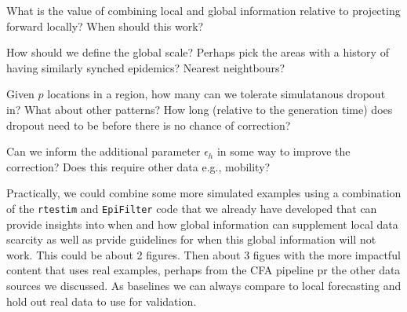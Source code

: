 \documentclass[12pt]{article}
\begin{document}
\bitem
\item What is the value of combining local and global information relative to
projecting forward locally? When should this work?
\item How should we define the global scale? Perhaps pick the areas with a
history of having similarly synched epidemics? Nearest neightbours?
\item Given $p$ locations in a region, how many can we tolerate simulatanous
dropout in? What about other patterns? How long (relative to the generation
time) does dropout need to be before there is no chance of correction?
\item Can we inform the additional parameter $\epsilon_h$ in some way to improve
the correction? Does this require other data e.g., mobility?
\eitem

Practically, we could combine some more simulated examples using a combination
of the \texttt{rtestim} and \texttt{EpiFilter} code that we already have
developed that can provide insights into when and how global information can
supplement local data scarcity as well as prvide guidelines for when this global
information will not work. This could be about 2 figures. Then about 3 figues
with the more impactful content that uses real examples, perhaps from the CFA
pipeline pr the other data sources we discussed. As baselines we can always
compare to local forecasting and hold out real data to use for validation. 
\end{document}
